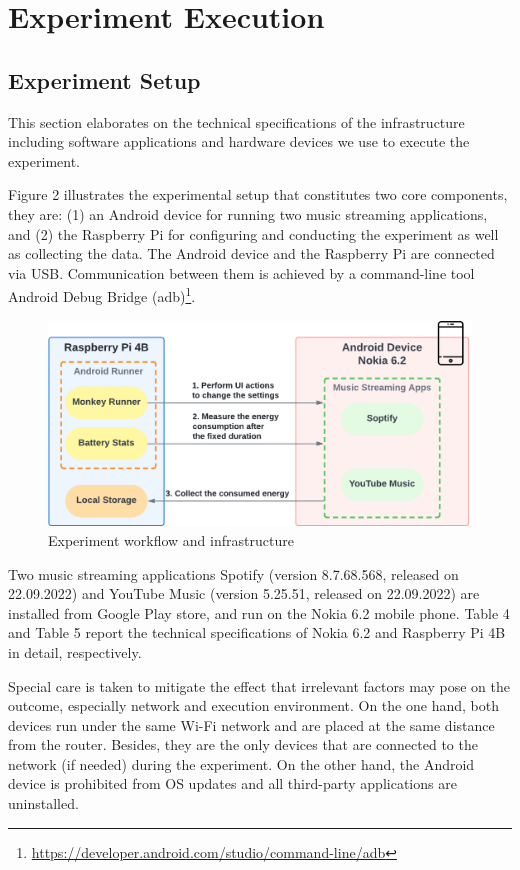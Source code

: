 \section{Experiment Execution}
\subsection{Experiment Setup}
This section elaborates on the technical specifications of the infrastructure including software applications and hardware devices we use to execute the experiment. 

	Figure 2 illustrates the experimental setup that constitutes two core components, they are: (1) an Android device for running two music streaming applications, and (2) the Raspberry Pi for configuring and conducting the experiment as well as collecting the data. The Android device and the Raspberry Pi are connected via USB. Communication between them is achieved by a command-line tool Android Debug Bridge (adb)\footnote{\label{note1}\href{ https://developer.android.com/studio/command-line/adb }{https://developer.android.com/studio/command-line/adb}}. 

\begin{figure}[htbp]
 \centering
 \includegraphics[width=0.8\linewidth]{figures/workflow.png}\textcolor{blue}{\caption{Experiment workflow and infrastructure}}
\end{figure}

Two music streaming applications Spotify (version 8.7.68.568, released on 22.09.2022) and YouTube Music (version 5.25.51, released on 22.09.2022) are installed from Google Play store, and run on the Nokia 6.2 mobile phone. {\color{blue}Table 4 and Table 5 report the technical specifications of Nokia 6.2 and Raspberry Pi 4B in detail, respectively.}

Special care is taken to mitigate the effect that irrelevant factors may pose on the outcome, especially network and execution environment. On the one hand, both devices run under the same Wi-Fi network and are placed at the same distance from the router. Besides, they are the only devices that are connected to the network (if needed) during the experiment. On the other hand, the Android device is prohibited from OS updates and all third-party applications are uninstalled. 

